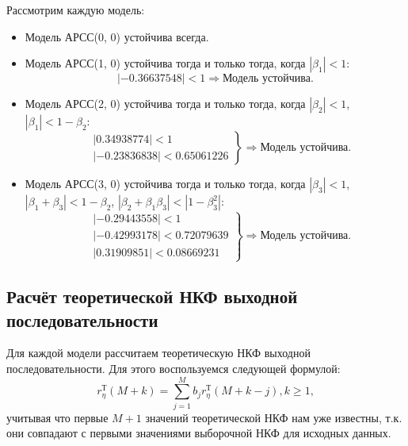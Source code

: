 \documentclass[12pt, fleqn]{article}
\begin{document}
{{		Рассмотрим каждую модель:
		\begin{itemize}
			\item {
				Модель АРСС(0, 0) устойчива всегда.
			}
			\item {
				Модель АРСС(1, 0) устойчива тогда и только тогда, когда $\left| \beta_1 \right| < 1$:
				\begin{equation*}
					\left|  -0.36637548 \right| < 1 \Rightarrow \text{Модель устойчива}.
				\end{equation*}
			}
			\item {
				Модель АРСС(2, 0) устойчива тогда и только тогда, когда $\left| \beta_2 \right| < 1$, $\left| \beta_1 \right| < 1 - \beta_2$:
				\begin{equation*}
					\left.
					\begin{split}
						&\left| 0.34938774 \right| < 1 \\
						&\left| -0.23836838 \right| < 0.65061226
					\end{split}
					\right\} \Rightarrow \text{Модель устойчива}.
				\end{equation*}
			}
			\item {		%
				Модель АРСС(3, 0) устойчива тогда и только тогда, когда $\left| \beta_3 \right| < 1$, $\left| \beta_1 + \beta_3 \right| < 1 - \beta_2$, $\left| \beta_2 + \beta_1 \beta_3 \right| < \left| 1 - \beta^2_3 \right|$:
				\begin{equation*}
					\left.
					\begin{split}
						&\left| -0.29443558 \right| < 1 \\
						&\left| -0.42993178 \right| < 0.72079639 \\
						&\left|  0.31909851 \right| < 0.08669231
					\end{split}
					\right\} \Rightarrow \text{Модель устойчива}.
				\end{equation*}
			}
		\end{itemize}
	}
					
	\subsection{Расчёт теоретической НКФ выходной последовательности} {
		Для каждой модели рассчитаем теоретическую НКФ выходной последовательности. Для этого воспользуемся следующей формулой:
		\begin{equation}
			r_{\eta}^{\text{Т}}(M + k) = \sum_{j=1}^{M}{b_j r_{\eta}^{\text{Т}}(M + k - j)}, k \geq 1,
		\end{equation}
		учитывая что первые $M + 1$ значений теоретической НКФ нам уже известны, т.к. они совпадают с первыми значениями выборочной НКФ для исходных данных. \medskip
				
}}
\end{document}

